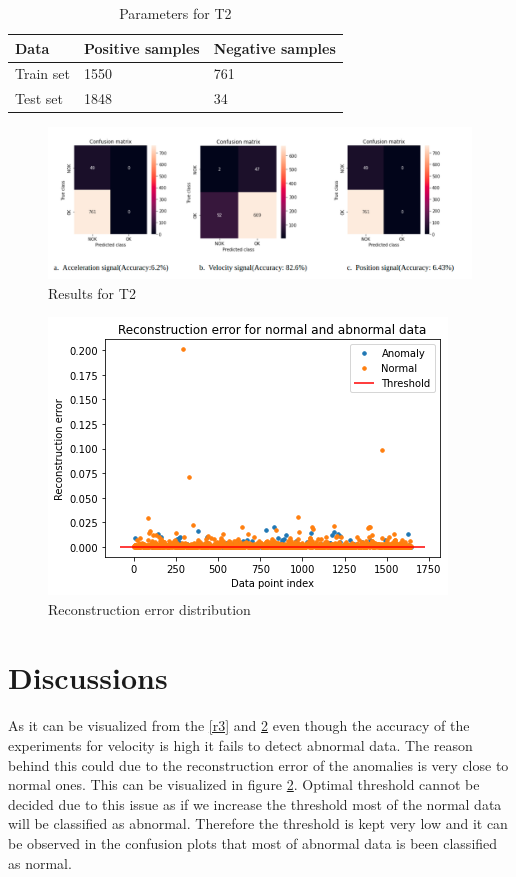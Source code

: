        \begin{table}[h]
       	\begin{tabular}{|l|l|l|}
       		\hline
       		Data      & Positive samples & Negative samples \\ \hline
       		Train set & 1550             & 761              \\ \hline
       		Test set  & 1848             & 34              \\ \hline
       	\end{tabular}
       	\caption{Parameters for T2}
       \end{table}
        \begin{figure}[h]
        	\centering
        	\includegraphics[width=1\linewidth]{images/r4.png}
        	\caption{Results for T2}
        	\label{llll}
        \end{figure}
        
       \begin{figure}[t]
       	\centering
       	\includegraphics[width=0.8\linewidth]{images/download.png}
       	\caption{Reconstruction error distribution}
       	\label{lll}
       	
       \end{figure}
   \section{Discussions} 
   As it can be visualized from the \ref{r3} and \ref{lll} even though the accuracy of the experiments for velocity is high it fails to detect abnormal data. The reason behind this could due to the reconstruction error of the anomalies is very close to normal ones. This can be visualized in figure \ref{lll}. Optimal threshold cannot be decided due to this issue as if we increase the threshold most of the normal data will be classified as abnormal. Therefore the threshold is kept very low and it can be observed in the confusion plots that most of abnormal data is been classified as normal.
   
